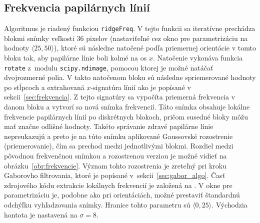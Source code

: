  \subsection{Frekvencia papilárnych línií}
  Algoritmus je riadený funkciou \texttt{ridgeFreq}. V tejto funkcii sa iteratívne prechádza blokmi snímky veľkosti 36 pixelov (nastaviťeľné cez okno pre
  parametrizáciu na hodnoty $\langle{}25,50\rangle{}$), ktoré sú následne natočené
  podľa priemernej orientácie v tomto bloku tak, aby papilárne línie boli kolmé na os $x$. Natočenie vykonáva funkcia \texttt{rotate} z~modulu
  \texttt{scipy.ndimage}, pomocou ktorej je možné natáčať dvojrozmerné polia. V takto natočenom bloku sú následne spriemerované hodnoty po stĺpcoch
  a extrahovaná $x$-signatúra línií ako je popísané v sekcii~{\ref{sec:frekvencia}}. Z tejto signatúry sa vypočíta priemerná frekvencia v danom bloku a vytvorí
  sa nová snímka frekvencií. Táto snímka
  obsahuje lokálne frekvencie papilárnych línií po diskrétnych blokoch, pričom susedné bloky môžu mať značne odlišné hodnoty. Takéto správanie zdravé papilárne
  línie nepreukazujú a preto je na túto snímku aplikované Gaussovské rozostrenie (priemerovanie), čím sa  prechod medzi jednotlivými blokmi.
  Rozdiel medzi pôvodnou frekvenčnou snímkou a rozostrenou verziou je možné vidieť na obrázku~{\ref{obr:frekvencie}}. Význam tohto rozostrenia je zreteľný pri
  kroku Gaborovho filtrovania, ktoré je popísané v~sekcii~{\ref{sec:gabor_algo}}.
  Časť zdrojového kódu extrakcie lokálnych frekvencií je založená na \cite{KovesiMATLABCode}.
  V okne pre parametrizáciu je, podobne ako pri orientáciách, možné prestaviť štandardnú odchýľku vyhľadzovania snímky. Hranice tohto parametru sú
  $\langle{}0,25\rangle{}$.
  Východzia hontota je nastavená na $\sigma = 8$.

